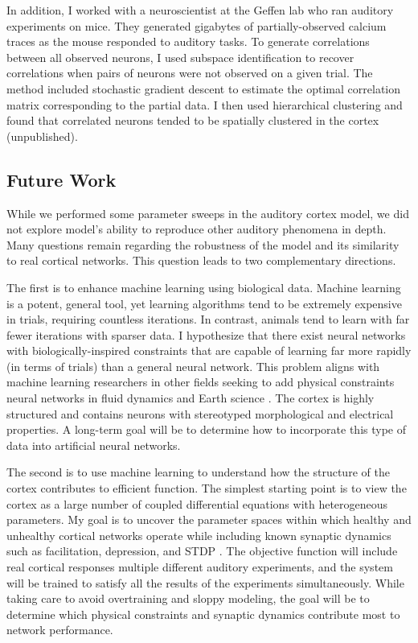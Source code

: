 \documentclass[a4paper,11pt]{article}
\begin{document}
In addition, I worked with a neuroscientist at the Geffen lab who ran auditory experiments on mice. They generated gigabytes of partially-observed calcium traces as the mouse responded to auditory tasks. To generate correlations between all observed neurons, I used subspace identification to recover correlations when pairs of neurons were not observed on a given trial. The method included stochastic gradient descent to estimate the optimal correlation matrix corresponding to the partial data. I then used hierarchical clustering and found that correlated neurons tended to be spatially clustered in the cortex (unpublished).

\subsection{Future Work}
While we performed some parameter sweeps in the auditory cortex model, we did not explore model's ability to reproduce other auditory phenomena in depth. Many questions remain regarding the robustness of the model and its similarity to real cortical networks. This question leads to two complementary directions.

The first is to enhance machine learning using biological data. Machine learning is a potent, general tool, yet learning algorithms tend to be extremely expensive in trials, requiring countless iterations. In contrast, animals tend to learn with far fewer iterations with sparser data. I hypothesize that there exist neural networks with biologically-inspired constraints that are capable of learning far more rapidly (in terms of trials) than a general neural network. This problem aligns with machine learning researchers in other fields seeking to add physical constraints neural networks in fluid dynamics \cite{mohan2020embedding} and Earth science \cite{pelissier2020combining}. The cortex is highly structured and contains neurons with stereotyped morphological and electrical properties. A long-term goal will be to determine how to incorporate this type of data into artificial neural networks.

The second is to use machine learning to understand how the structure of the cortex contributes to efficient function. The simplest starting point is to view the cortex as a large number of coupled differential equations with heterogeneous parameters. My goal is to uncover the parameter spaces within which healthy and unhealthy cortical networks operate while including known synaptic dynamics such as facilitation, depression, and STDP \cite{lee2018training}. The objective function will include real cortical responses multiple different auditory experiments, and the system will be trained to satisfy all the results of the experiments simultaneously. While taking care to avoid overtraining and sloppy modeling, the goal will be to determine which physical constraints and synaptic dynamics contribute most to network performance.
\end{document}
